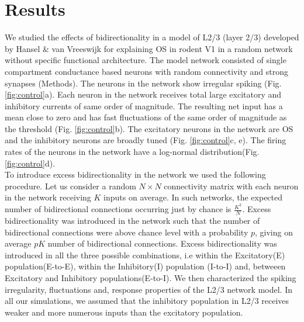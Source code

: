 \section{Results}
We studied the effects of bidirectionality in a model of L2/3 (layer 2/3) developed by Hansel \& van Vreeswijk \cite{Hansel2012} for explaining OS in rodent V1 in a random network without specific functional architecture. The model network consisted of single compartment conductance based neurons with random connectivity and strong synapses (Methods). The neurons in the network show irregular spiking (Fig. \ref{fig:control}a). Each neuron in the network receives total large excitatory and inhibitory currents of same order of magnitude. The resulting net input has a mean close to zero and has fast fluctuations of the same order of magnitude as the threshold (Fig. \ref{fig:control}b). The excitatory neurons in the network are OS and the inhibitory neurons are broadly tuned (Fig. \ref{fig:control}c, e). The firing rates of the neurons in the network have a log-normal distribution(Fig. \ref{fig:control}d).  \\

To introduce excess bidirectionality in the network we used the following procedure. Let us consider a random $N \times N$ connectivity matrix with each neuron in the network receiving $K$ inputs on average. In such networks, the expected number of bidirectional connections occurring just by chance is $\frac{K^2}{N}$. Excess bidirectionality was introduced in the network such that the number of bidirectional connections were above chance level with a probability $p$, giving on average $pK$ number of bidirectional connections.
Excess bidirectionality was introduced in all the three possible combinations, i.e within the Excitatory(E) population(E-to-E), within the Inhibitory(I) population (I-to-I) and, betweeen Excitatory and Inhibitory populations(E-to-I). We then characterized the spiking irregularity, fluctuations and, response properties of the L2/3 network model. In all our simulations, we assumed that the inhibitory population in L2/3 receives weaker and more numerous inputs than the excitatory population.   \\

